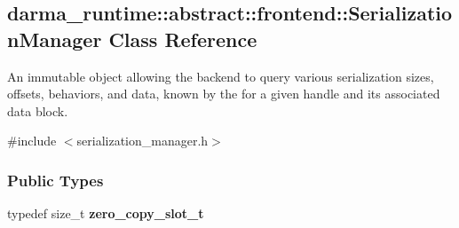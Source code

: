 \hypertarget{classdarma__runtime_1_1abstract_1_1frontend_1_1_serialization_manager}{}\subsection{darma\+\_\+runtime\+:\+:abstract\+:\+:frontend\+:\+:Serialization\+Manager Class Reference}
\label{classdarma__runtime_1_1abstract_1_1frontend_1_1_serialization_manager}


An immutable object allowing the backend to query various serialization sizes, offsets, behaviors, and data, known by the for a given handle and its associated data block.  




{\ttfamily \#include $<$serialization\+\_\+manager.\+h$>$}

\subsubsection*{Public Types}
\begin{DoxyCompactItemize}
\item 
typedef size\+\_\+t {\bfseries zero\+\_\+copy\+\_\+slot\+\_\+t}\hypertarget{classdarma__runtime_1_1abstract_1_1frontend_1_1_serialization_manager_a34f35ed56d081e65db2f7ec52d5eda7b}{}\label{classdarma__runtime_1_1abstract_1_1frontend_1_1_serialization_manager_a34f35ed56d081e65db2f7ec52d5eda7b}

\end{DoxyCompactItemize}
